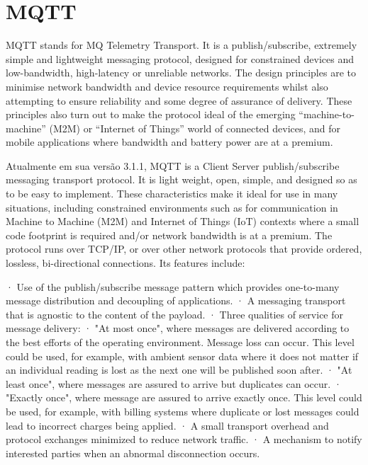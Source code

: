 \section{MQTT}

MQTT stands for MQ Telemetry Transport. It is a publish/subscribe, extremely simple and lightweight messaging protocol, designed for constrained devices and low-bandwidth, high-latency or unreliable networks. The design principles are to minimise network bandwidth and device resource requirements whilst also attempting to ensure reliability and some degree of assurance of delivery. These principles also turn out to make the protocol ideal of the emerging “machine-to-machine” (M2M) or “Internet of Things” world of connected devices, and for mobile applications where bandwidth and battery power are at a premium.


Atualmente em sua versão 3.1.1, MQTT is a Client Server publish/subscribe messaging transport protocol. It is light weight, open, simple, and designed so as to be easy to implement. These characteristics make it ideal for use in many situations, including constrained environments such as for communication in Machine to Machine (M2M) and Internet of Things (IoT) contexts where a small code footprint is required and/or network bandwidth is at a premium.
The protocol runs over TCP/IP, or over other network protocols that provide ordered, lossless, bi-directional connections. Its features include:

·         Use of the publish/subscribe message pattern which provides one-to-many message distribution and decoupling of applications.
·         A messaging transport that is agnostic to the content of the payload.
·         Three qualities of service for message delivery:
·         "At most once", where messages are delivered according to the best efforts of the operating environment. Message loss can occur. This level could be used, for example, with ambient sensor data where it does not matter if an individual reading is lost as the next one will be published soon after.
·         "At least once", where messages are assured to arrive but duplicates can occur.
·         "Exactly once", where message are assured to arrive exactly once. This level could be used, for example, with billing systems where duplicate or lost messages could lead to incorrect charges being applied.
·         A small transport overhead and protocol exchanges minimized to reduce network traffic.
·         A mechanism to notify interested parties when an abnormal disconnection occurs.

